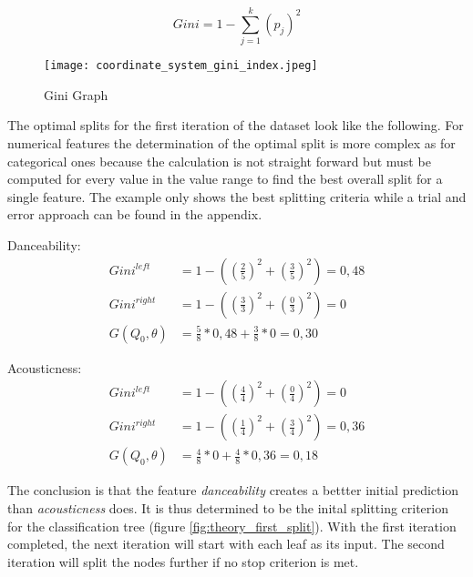 \begin{equation}
    Gini = 1 - \sum ^k_{j = 1}(p_{j})^2
    \label{equ:dt_gini}
\end{equation}

\begin{figure}[H]
    \centering
    \caption[]{Gini Graph}
	\label{fig:coordinate_system_initial_dataset}
    \texttt{[image: coordinate\_system\_gini\_index.jpeg]}
\end{figure}

The optimal splits for the first iteration of the dataset look like the following. For numerical features the determination of 
the optimal split is more complex as for categorical ones because the calculation is not straight forward but must be computed
for every value in the value range to find the best overall split for a single feature. The example only shows the best splitting
criteria while a trial and error approach can be found in the appendix. 

Danceability: 
\begin{equation*}
    \begin{aligned}
        Gini^{left} &= 1 - ((\frac{2}{5})^2 + (\frac{3}{5})^2) = 0,48 
        \\
        Gini^{right}  &= 1 - ((\frac{3}{3})^2 + (\frac{0}{3})^2) = 0 
        \\
        G(Q_{0},\theta) &= \frac{5}{8} * 0,48 + \frac{3}{8} * 0 = 0,30
    \end{aligned}
\end{equation*}

Acousticness: 
\begin{equation*}
    \begin{aligned}
        Gini^{left}  &= 1 - ((\frac{4}{4})^2 + (\frac{0}{4})^2) = 0
        \\
        Gini^{right} &= 1 - ((\frac{1}{4})^2 + (\frac{3}{4})^2) = 0,36
        \\
        G(Q_{0},\theta) &= \frac{4}{8} * 0 + \frac{4}{8} * 0,36 = 0,18
    \end{aligned}
\end{equation*}

The conclusion is that the feature \emph{danceability} creates a bettter initial prediction than \emph{acousticness} does. It is thus 
determined to be the inital splitting criterion for the classification tree (figure \ref{fig:theory_first_split}). With the first iteration completed, the next iteration
will start with each leaf as its input. The second iteration will split the nodes further if no stop criterion is met. 

